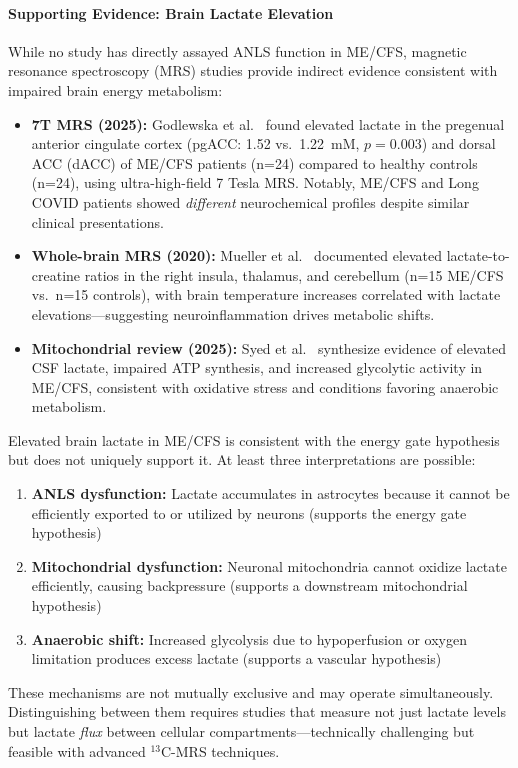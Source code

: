\paragraph{Supporting Evidence: Brain Lactate Elevation}

While no study has directly assayed ANLS function in ME/CFS, magnetic resonance spectroscopy (MRS) studies provide indirect evidence consistent with impaired brain energy metabolism:

\begin{itemize}
    \item \textbf{7T MRS (2025):} Godlewska et al.~\cite{Godlewska2025MRS} found elevated lactate in the pregenual anterior cingulate cortex (pgACC: 1.52 vs.\ 1.22~mM, $p = 0.003$) and dorsal ACC (dACC) of ME/CFS patients (n=24) compared to healthy controls (n=24), using ultra-high-field 7 Tesla MRS. Notably, ME/CFS and Long COVID patients showed \emph{different} neurochemical profiles despite similar clinical presentations.

    \item \textbf{Whole-brain MRS (2020):} Mueller et al.~\cite{Mueller2020MRS} documented elevated lactate-to-creatine ratios in the right insula, thalamus, and cerebellum (n=15 ME/CFS vs.\ n=15 controls), with brain temperature increases correlated with lactate elevations---suggesting neuroinflammation drives metabolic shifts.

    \item \textbf{Mitochondrial review (2025):} Syed et al.~\cite{Syed2025} synthesize evidence of elevated CSF lactate, impaired ATP synthesis, and increased glycolytic activity in ME/CFS, consistent with oxidative stress and conditions favoring anaerobic metabolism.
\end{itemize}

\begin{warning}
Elevated brain lactate in ME/CFS is consistent with the energy gate hypothesis but does not uniquely support it. At least three interpretations are possible:
\begin{enumerate}
    \item \textbf{ANLS dysfunction:} Lactate accumulates in astrocytes because it cannot be efficiently exported to or utilized by neurons (supports the energy gate hypothesis)
    \item \textbf{Mitochondrial dysfunction:} Neuronal mitochondria cannot oxidize lactate efficiently, causing backpressure (supports a downstream mitochondrial hypothesis)
    \item \textbf{Anaerobic shift:} Increased glycolysis due to hypoperfusion or oxygen limitation produces excess lactate (supports a vascular hypothesis)
\end{enumerate}
These mechanisms are not mutually exclusive and may operate simultaneously. Distinguishing between them requires studies that measure not just lactate levels but lactate \emph{flux} between cellular compartments---technically challenging but feasible with advanced $^{13}$C-MRS techniques.
\end{warning}

